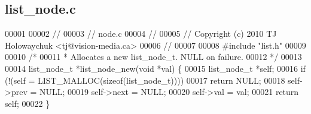 \subsection{list\+\_\+node.\+c}
\label{a00116_source}

\begin{DoxyCode}
00001 
00002 \textcolor{comment}{//}
00003 \textcolor{comment}{// node.c}
00004 \textcolor{comment}{//}
00005 \textcolor{comment}{// Copyright (c) 2010 TJ Holowaychuk <tj@vision-media.ca>}
00006 \textcolor{comment}{//}
00007 
00008 \textcolor{preprocessor}{#include "list.h"}
00009 
00010 \textcolor{comment}{/*}
00011 \textcolor{comment}{ * Allocates a new list\_node\_t. NULL on failure.}
00012 \textcolor{comment}{ */}
00013 
00014 list_node_t *list_node_new(\textcolor{keywordtype}{void} *val) \{
00015   list_node_t *\textcolor{keyword}{self};
00016   \textcolor{keywordflow}{if} (!(\textcolor{keyword}{self} = LIST_MALLOC(\textcolor{keyword}{sizeof}(list_node_t))))
00017     \textcolor{keywordflow}{return} NULL;
00018   \textcolor{keyword}{self}->prev = NULL;
00019   \textcolor{keyword}{self}->next = NULL;
00020   \textcolor{keyword}{self}->val = val;
00021   \textcolor{keywordflow}{return} \textcolor{keyword}{self};
00022 \}
\end{DoxyCode}
